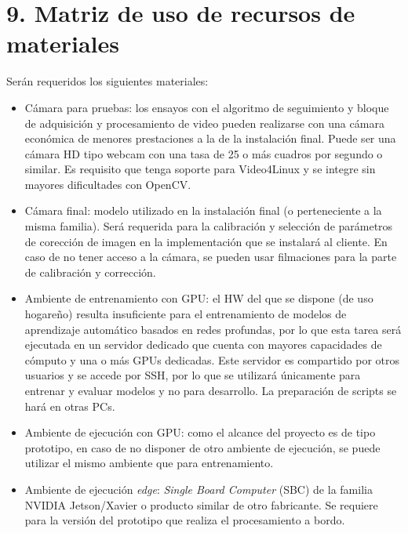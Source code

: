 \documentclass[11pt]{charter}
\begin{document}
\section{9. Matriz de uso de recursos de materiales}
\label{sec:recursos}

Serán requeridos los siguientes materiales:

\begin{itemize}
	\item Cámara para pruebas: los ensayos con el algoritmo de seguimiento y bloque de adquisición y procesamiento de video pueden realizarse con una cámara económica de menores prestaciones a la de la instalación final. Puede ser una cámara HD tipo webcam con una tasa de 25 o más cuadros por segundo o similar. Es requisito que tenga soporte para Video4Linux y se integre sin mayores dificultades con OpenCV.
	\item Cámara final: modelo utilizado en la instalación final (o perteneciente a la misma familia). Será requerida para la calibración y selección de parámetros de corección de imagen en la implementación que se instalará al cliente. En caso de no tener acceso a la cámara, se pueden usar filmaciones para la parte de calibración y corrección.
	\item Ambiente de entrenamiento con GPU: el HW del que se dispone (de uso hogareño) resulta insuficiente para el entrenamiento de modelos de aprendizaje automático basados en redes profundas, por lo que esta tarea será ejecutada en un servidor dedicado que cuenta con mayores capacidades de cómputo y una o más GPUs dedicadas. Este servidor es compartido por otros usuarios y se accede por SSH, por lo que se utilizará únicamente para entrenar y evaluar modelos y no para desarrollo. La preparación de scripts se hará en otras PCs.
	\item Ambiente de ejecución con GPU: como el alcance del proyecto es de tipo prototipo, en caso de no disponer de otro ambiente de ejecución, se puede utilizar el mismo ambiente que para entrenamiento.
	\item Ambiente de ejecución {\em edge}: {\em Single Board Computer} (SBC) de la familia NVIDIA Jetson/Xavier o producto similar de otro fabricante. Se requiere para la versión del prototipo que realiza el procesamiento a bordo.
\end{itemize}
\end{document}

